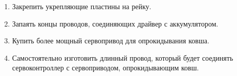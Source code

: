 \begin{enumerate}
\begin{enumerate}
		\item Закрепить укрепляющие пластины на рейку.
		
	    \item Запаять концы проводов, соединяющих драйвер с аккумулятором.
	    
	    \item Купить более мощный сервопривод для опрокидывания ковша.
	    
	    \item Самостоятельно изготовить длинный провод, который будет соединять сервоконтроллер с сервоприводом, опрокидывающим ковш.
		 
	\end{enumerate}
	
\end{enumerate}
\fillpage